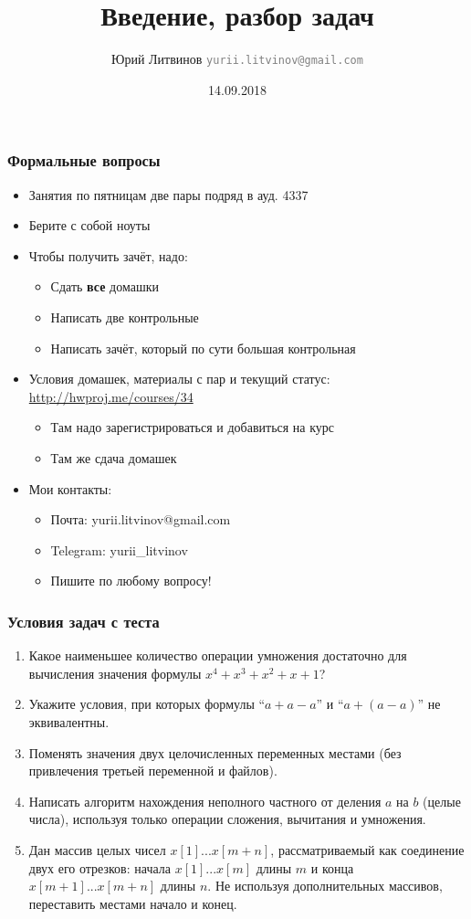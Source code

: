 \documentclass[xetex,mathserif,serif]{beamer}
\title{Введение, разбор задач}
\author[Юрий Литвинов]{Юрий Литвинов \newline \textcolor{gray}{\small\texttt{yurii.litvinov@gmail.com}}}
\date{14.09.2018}
\begin{document}
	
	\frame{\titlepage}
	
	\begin{frame}
		\frametitle{Формальные вопросы}
		\begin{itemize}
			\item Занятия по пятницам две пары подряд в ауд. 4337
			\item Берите с собой ноуты
			\item Чтобы получить зачёт, надо:
			\begin{itemize}
				\item Сдать \textbf{все} домашки
				\item Написать две контрольные
				\item Написать зачёт, который по сути большая контрольная
			\end{itemize}
			\item Условия домашек, материалы с пар и текущий статус: \url{http://hwproj.me/courses/34}
			\begin{itemize}
				\item Там надо зарегистрироваться и добавиться на курс
				\item Там же сдача домашек
			\end{itemize}
			\item Мои контакты:
			\begin{itemize}
				\item Почта: yurii.litvinov@gmail.com
				\item Telegram: yurii\_litvinov
				\item Пишите по любому вопросу!
			\end{itemize}
		\end{itemize}
	\end{frame}

	\begin{frame}
		\frametitle{Условия задач с теста}
		\begin{enumerate}
			\item Какое наименьшее количество операции умножения достаточно для вычисления значения формулы $x^4 + x^3 + x^2 + x + 1$?
			\item Укажите условия, при которых формулы ``$a + a - a$'' и ``$a + (a - a)$'' не эквивалентны.
			\item Поменять значения двух целочисленных переменных местами (без привлечения третьей переменной и файлов).
			\item Написать алгоритм нахождения неполного частного от деления $a$ на $b$ (целые числа), используя только операции сложения, вычитания и умножения.
			\item Дан массив целых чисел $x[1]...x[m+n]$, рассматриваемый как соединение двух его отрезков: начала $x[1]...x[m]$ длины $m$ и конца $x[m+1]...x[m+n]$ длины $n$. Не используя дополнительных массивов, переставить местами начало и конец.
		\end{enumerate}
	\end{frame}
\end{document}
